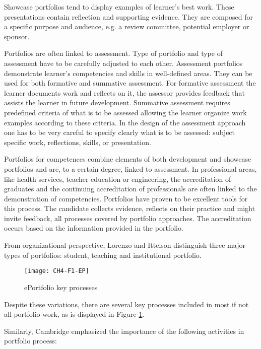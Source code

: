 Showcase portfolios tend to display examples of learner's best work. These
presentations contain reflection and supporting evidence. They are composed for
a specific purpose and audience, e.g. a review committee, potential employer or
sponsor.

Portfolios are often linked to assessment. Type of portfolio and type of
assessment have to be carefully adjusted to each other. Assessment portfolios
demonstrate learner's competencies and skills in well-defined areas. They can be
used for both formative and summative assessment. For formative assessment the
learner documents work and reflects on it, the assessor provides feedback that
assists the learner in future development. Summative assessment requires
predefined criteria of what is to be assessed allowing the learner organize work
examples according to these criteria. In the design of the assessment approach
one has to be very careful to specify clearly what is to be assessed: subject
specific work, reflections, \LLLs skills, or presentation.

Portfolios for competences combine elements of both development and showcase
portfolios and are, to a certain degree, linked to assessment. In professional
areas, like health services, teacher education or engineering, the accreditation
of graduates and the continuing accreditation of professionals are often linked
to the demonstration of competencies. Portfolios have proven to be excellent
tools for this process. The candidate collects evidence, reflects on their
practice and might invite feedback, all processes covered by portfolio
approaches. The accreditation occurs based on the information provided in the
portfolio.

From organizational perspective, Lorenzo and Ittelson \citeyearpar{Lorenzo2005}
distinguish three major types of portfolios: student, teaching and
institutional portfolio.

\begin{figure}[htb]
\centering
\texttt{[image: CH4-F1-EP]}
\caption[ePortfolio key processes]{ePortfolio key processes \citep{Malloff2010}}
\label{fig:ep}
\end{figure}

Despite these variations, there are several key processes included in most if
not all portfolio work, as is displayed in Figure \ref{fig:ep}.
 
Similarly, Cambridge \citeyearpar{Cambridge2010} emphasized the importance of
the following activities in portfolio process:

